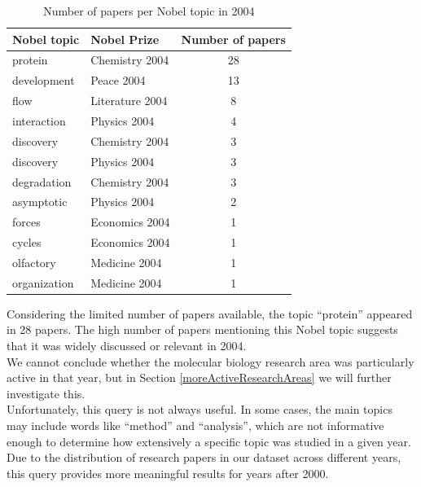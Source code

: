\documentclass{article}
\begin{document}
\begin{table}[H]
	\centering
	\begin{tabular}{|l|l|c|}
		\hline
		\textbf{Nobel topic} & \textbf{Nobel Prize} & \textbf{Number of papers} \\ \hline
		protein              & Chemistry 2004       & 28                        \\ \hline
		development          & Peace 2004           & 13                        \\ \hline
		flow                 & Literature 2004      & 8                         \\ \hline
		interaction          & Physics 2004         & 4                         \\ \hline
		discovery            & Chemistry 2004       & 3                         \\ \hline
		discovery            & Physics 2004         & 3                         \\ \hline
		degradation          & Chemistry 2004       & 3                         \\ \hline
		asymptotic           & Physics 2004         & 2                         \\ \hline
		forces               & Economics 2004       & 1                         \\ \hline
		cycles               & Economics 2004       & 1                         \\ \hline
		olfactory            & Medicine 2004        & 1                         \\ \hline
		organization         & Medicine 2004        & 1                         \\ \hline
	\end{tabular}
	\caption{Number of papers per Nobel topic in 2004}
	\label{tab:papersNobelTopicsYear}
\end{table}

\newpage

Considering the limited number of papers available, the topic ``protein'' appeared
in 28 papers. The high number of papers mentioning this Nobel topic suggests that
it was widely discussed or relevant in 2004.\\
We cannot conclude whether the molecular biology research area was particularly active
in that year, but in Section \ref{moreActiveResearchAreas} we will further
investigate this.\\
Unfortunately, this query is not always useful. In some cases, the
main topics may include words like ``method'' and ``analysis'', which are not
informative enough to determine how extensively a specific topic was studied
in a given year.\\
Due to the distribution of research papers in our dataset across different years,
this query provides more meaningful results for years after 2000.
\end{document}
